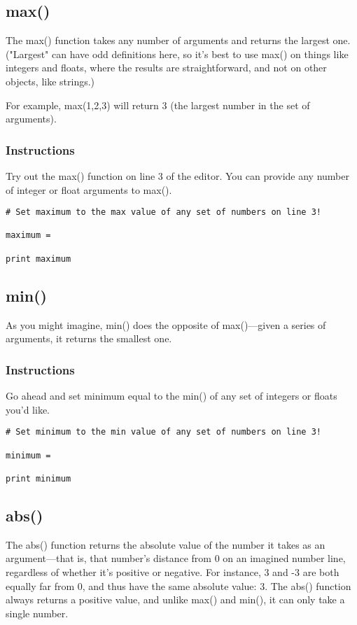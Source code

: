 \documentclass[12pt,a4paper,final,twoside,onecolumn,titlepage]{book}
\begin{document}
\subsection{max()}

The max() function takes any number of arguments and returns the largest one. ("Largest" can have odd definitions here, so it's best to use max() on things like integers and floats, where the results are straightforward, and not on other objects, like strings.)

For example, max(1,2,3) will return 3 (the largest number in the set of arguments).
\subsubsection{Instructions}

Try out the max() function on line 3 of the editor. You can provide any number of integer or float arguments to max().

\begin{lstlisting}
# Set maximum to the max value of any set of numbers on line 3!

maximum = 

print maximum
\end{lstlisting}

\subsection{min()}

As you might imagine, min() does the opposite of max()—given a series of arguments, it returns the smallest one.
\subsubsection{Instructions}

Go ahead and set minimum equal to the min() of any set of integers or floats you'd like.

\begin{lstlisting}
# Set minimum to the min value of any set of numbers on line 3!

minimum = 

print minimum
\end{lstlisting}


\subsection{abs()}

The abs() function returns the absolute value of the number it takes as an argument—that is, that number's distance from 0 on an imagined number line, regardless of whether it's positive or negative. For instance, 3 and -3 are both equally far from 0, and thus have the same absolute value: 3. The abs() function always returns a positive value, and unlike max() and min(), it can only take a single number.
\end{document}
